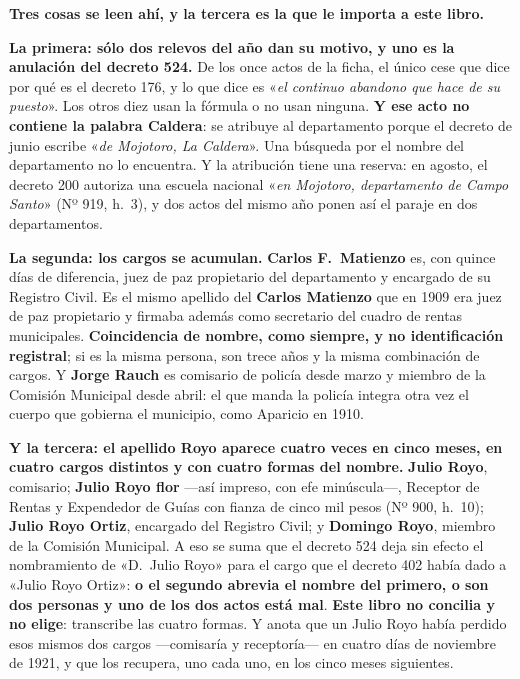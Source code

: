 \begin{cautela}
\textbf{Tres cosas se leen ahí, y la tercera es la que le importa a este libro.}

\textbf{La primera: sólo dos relevos del año dan su motivo, y uno es la anulación del decreto 524.} De los once actos de la ficha, el único cese
que dice por qué es el decreto 176, y lo que dice es «\textit{el continuo abandono que hace de su
puesto}». Los otros diez usan la fórmula o no usan ninguna. \textbf{Y ese acto no contiene la
palabra Caldera}: se atribuye al departamento porque el decreto de junio escribe «\textit{de
Mojotoro, La Caldera}». Una búsqueda por el nombre del departamento no lo encuentra. Y la
atribución tiene una reserva: en agosto, el decreto 200 autoriza una escuela nacional «\textit{en
Mojotoro, departamento de Campo Santo}» (Nº 919, h.\ 3), y dos actos del mismo año ponen así el
paraje en dos departamentos.

\textbf{La segunda: los cargos se acumulan.} \textbf{Carlos F.\ Matienzo} es, con quince días de
diferencia, juez de paz propietario del departamento y encargado de su Registro Civil. Es el
mismo apellido del \textbf{Carlos Matienzo} que en 1909 era juez de paz propietario y firmaba
además como secretario del cuadro de rentas municipales. \textbf{Coincidencia de nombre, como
siempre, y no identificación registral}; si es la misma persona, son trece años y la misma
combinación de cargos. Y \textbf{Jorge Rauch} es comisario de policía desde marzo y miembro de la
Comisión Municipal desde abril: el que manda la policía integra otra vez el cuerpo que gobierna
el municipio, como Aparicio en 1910.

\textbf{Y la tercera: el apellido Royo aparece cuatro veces en cinco meses, en cuatro cargos
distintos y con cuatro formas del nombre.} \textbf{Julio Royo}, comisario; \textbf{Julio Royo
flor} ---así impreso, con efe minúscula---, Receptor de Rentas y Expendedor de Guías con fianza
de cinco mil pesos (Nº 900, h.\ 10); \textbf{Julio Royo Ortiz}, encargado del Registro Civil; y
\textbf{Domingo Royo}, miembro de la Comisión Municipal. A eso se suma que el decreto 524 deja
sin efecto el nombramiento de «D.\ Julio Royo» para el cargo que el decreto 402 había dado a
«Julio Royo Ortiz»: \textbf{o el segundo abrevia el nombre del primero, o son dos personas y uno
de los dos actos está mal}. \textbf{Este libro no concilia y no elige}: transcribe las cuatro
formas. Y anota que un Julio Royo había perdido esos mismos dos cargos ---comisaría y
receptoría--- en cuatro días de noviembre de 1921, y que los recupera, uno cada uno, en los cinco
meses siguientes.
\end{cautela}

